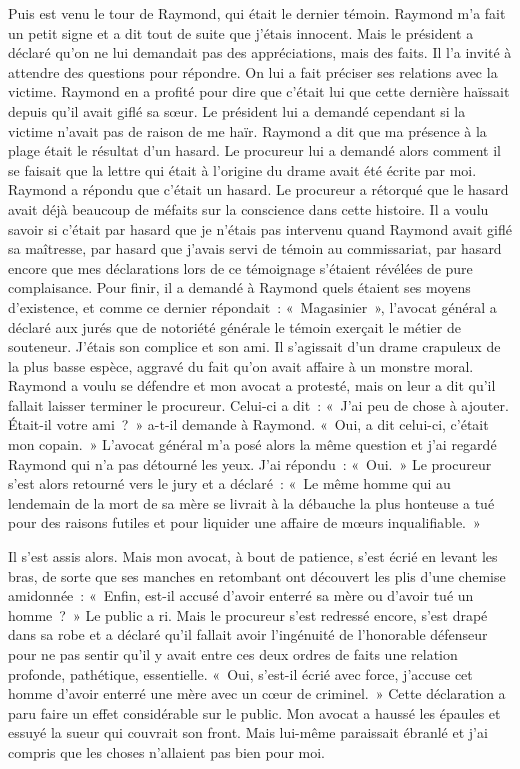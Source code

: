 \documentclass[french,twoside]{book} %
\begin{document}
Puis est venu le tour de Raymond, qui était le dernier témoin. Raymond m’a fait un petit signe et a dit tout de suite que j’étais innocent. Mais le président a déclaré qu’on ne lui demandait pas des appréciations, mais des faits. Il l’a invité à attendre des questions pour répondre. On lui a fait préciser ses relations avec la victime. Raymond en a profité pour dire que c’était lui que cette dernière haïssait depuis qu’il avait giflé sa sœur. Le président lui a demandé cependant si la victime n’avait pas de raison de me haïr. Raymond a dit que ma présence à la plage était le résultat d’un hasard. Le procureur lui a demandé alors comment il se faisait que la lettre qui était à l’origine du drame avait été écrite par moi. Raymond a répondu que c’était un hasard. Le procureur a rétorqué que le hasard avait déjà beaucoup de méfaits sur la conscience dans cette histoire. Il a voulu savoir si c’était par hasard que je n’étais pas intervenu quand Raymond avait giflé sa maîtresse, par hasard que j’avais servi de témoin au commissariat, par hasard encore que mes déclarations lors de ce témoignage s’étaient révélées de pure complaisance. Pour finir, il a demandé à Raymond quels étaient ses moyens d’existence, et comme ce dernier répondait : « Magasinier », l’avocat général a déclaré aux jurés que de notoriété générale le témoin exerçait le métier de souteneur. J'étais son complice et son ami. Il s’agissait d’un drame crapuleux de la plus basse espèce, aggravé du fait qu’on avait affaire à un monstre moral. Raymond a voulu se défendre et mon avocat a protesté, mais on leur a dit qu’il fallait laisser terminer le procureur. Celui-ci a dit : « J'ai peu de chose à ajouter. Était-il votre ami ? » a-t-il demande à Raymond. « Oui, a dit celui-ci, c’était mon copain. » L'avocat général m’a posé alors la même question et j’ai regardé Raymond qui n’a pas détourné les yeux. J'ai répondu : « Oui. » Le procureur s’est alors retourné vers le jury et a déclaré : « Le même homme qui au lendemain de la mort de sa mère se livrait à la débauche la plus honteuse a tué pour des raisons futiles et pour liquider une affaire de mœurs inqualifiable. »\par
Il s’est assis alors. Mais mon avocat, à bout de patience, s’est écrié en levant les bras, de sorte que ses manches en retombant ont découvert les plis d’une chemise amidonnée : « Enfin, est-il accusé d’avoir enterré sa mère ou d’avoir tué un homme ? » Le public a ri. Mais le procureur s’est redressé encore, s’est drapé dans sa robe et a déclaré qu’il fallait avoir l’ingénuité de l’honorable défenseur pour ne pas sentir qu’il y avait entre ces deux ordres de faits une relation profonde, pathétique, essentielle. « Oui, s’est-il écrié avec force, j’accuse cet homme d’avoir enterré une mère avec un cœur de criminel. » Cette déclaration a paru faire un effet considérable sur le public. Mon avocat a haussé les épaules et essuyé la sueur qui couvrait son front. Mais lui-même paraissait ébranlé et j’ai compris que les choses n’allaient pas bien pour moi.\par
\end{document}
